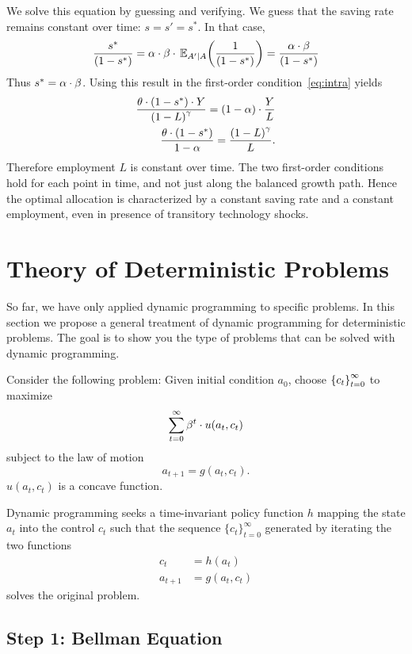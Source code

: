 \documentclass[letterpaper,12pt,leqno]{article}
\begin{document}
We solve this equation by guessing and verifying. We guess that the saving rate remains constant over time: $s=s'=s^*$. In that case, 
\begin{align*}
\frac{s^*}{\bp{1-s^*}}=\a\cdot \b \cdot \E[A'|A]{\frac{1}{\bp{1-s^*}}}=\frac{\a\cdot \b}{\bp{1-s^*}  }
\end{align*}
Thus $s^* =\alpha\cdot \beta$. Using this result in the first-order condition~\eqref{eq:intra} yields
\begin{align*}
\frac{\theta \cdot \left( 1-s^* \right) \cdot Y}{\left( 1-L \right)^{\gamma}} =\left( 1-\alpha \right)\cdot \frac{Y}{L}\\
\frac{\theta \cdot \left( 1-s^* \right)}{1-\alpha} = \frac{\left( 1-L \right)^{\gamma}}{L}.
\end{align*}
Therefore employment $L$ is constant over time. The two first-order conditions hold for each point in time, and not just along the balanced growth path. Hence the optimal allocation is characterized by a constant saving rate and a constant employment, even in presence of transitory technology shocks.


\section{Theory of Deterministic Problems}\label{sec:theory}

So far, we have only applied dynamic programming to specific problems. In this section we propose a general treatment of dynamic programming for deterministic problems. The goal is to show you the type of problems that can be solved with dynamic programming.

Consider the following problem: Given initial condition $a_{0}$, choose $\left\lbrace c_{t} \right\rbrace_{t=0}^{\infty}$ to maximize
\begin{align*}
\sum_{t=0}^{\infty}\beta^{t}\cdot u(a_{t},c_{t})
\end{align*}
subject to the law of motion
\[a_{t+1}=g(a_{t},c_{t}).\]
$u(a_{t},c_{t})$ is a concave function. 

Dynamic programming seeks a time-invariant policy function $h$ mapping the state $a_{t}$  into the control $c_{t}$  such that the sequence
$\{c_{t}\}_{t=0}^{\infty}$ generated by iterating the two functions
\begin{align*}
c_{t} & =h(a_{t}) \\
a_{t+1} & =g(a_{t},c_{t})
\end{align*}
solves the original problem.

\subsection{Step 1: Bellman Equation}
\end{document}
